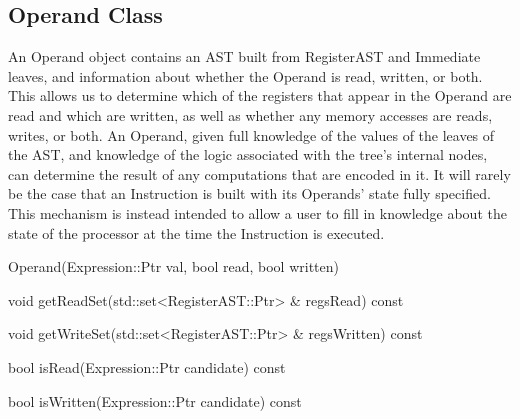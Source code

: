 \subsection{Operand Class}
\label{sec:operand}

An Operand object contains an AST built from RegisterAST and Immediate leaves,
and information about whether the Operand is read, written, or both. This allows
us to determine which of the registers that appear in the Operand are read and
which are written, as well as whether any memory accesses are reads, writes, or
both. An Operand, given full knowledge of the values of the leaves of the AST,
and knowledge of the logic associated with the tree's internal nodes, can
determine the result of any computations that are encoded in it. It will rarely
be the case that an Instruction is built with its Operands' state fully
specified. This mechanism is instead intended to allow a user to fill in
knowledge about the state of the processor at the time the Instruction is
executed. 

\begin{apient}
Operand(Expression::Ptr val, bool read, bool written)
\end{apient}

\begin{apient}
void getReadSet(std::set<RegisterAST::Ptr> & regsRead) const
\end{apient}

\begin{apient}
void getWriteSet(std::set<RegisterAST::Ptr> & regsWritten) const
\end{apient}

\begin{apient}
bool isRead(Expression::Ptr candidate) const
\end{apient}

\begin{apient}
bool isWritten(Expression::Ptr candidate) const
\end{apient}

